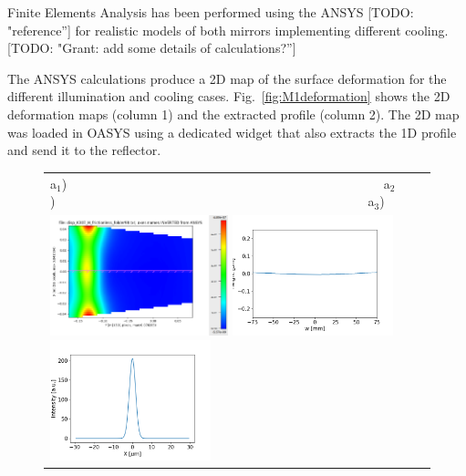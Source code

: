 \documentclass[]{spie}  %
\newcommand{\todo}[1]{{\color{red}[TODO: "#1'']}}
\begin{document}
Finite Elements Analysis has been performed using the ANSYS \todo{reference} for realistic models of both mirrors implementing different cooling. \todo{Grant: add some details of calculations?}

The ANSYS calculations produce a 2D map of the surface deformation for the different illumination and cooling cases. Fig.~\ref{fig:M1deformation} shows the 2D deformation maps (column 1) and the extracted profile (column 2). The 2D map was loaded in OASYS using a dedicated widget that also extracts the 1D profile and send it to the reflector. 

\newpage 

   \begin{figure} [ht]
  \begin{center}
   \begin{tabular}{l} 
   a$_1$)~~~~~~~~~~~~~~~~~~~~~~~~~~~~~~~~~~~~~~~~~~~~~~~~~
   a$_2$)~~~~~~~~~~~~~~~~~~~~~~~~~~~~~~~~~~~~~~~~~~~~~~~~~a$_3$)\\
   \includegraphics[height=3.5cm]{figures/cryogenic2d.png} 
   \includegraphics[height=3.5cm]{figures/deformationcryogenic1d.png}
   \includegraphics[height=3.5cm]{figures/intensitycryogenic.png} \\


\end{tabular}
\end{center}
\end{figure}
\end{document}
